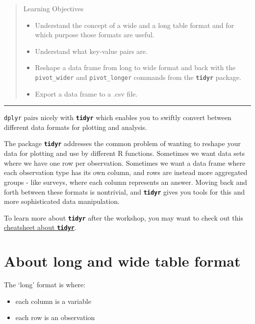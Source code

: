 \documentclass[
]{book}
\providecommand{\tightlist}{%
  \setlength{\itemsep}{0pt}\setlength{\parskip}{0pt}}
\begin{document}
\begin{quote}
Learning Objectives

\begin{itemize}
\tightlist
\item
  Understand the concept of a wide and a long table format and for which purpose those formats are useful.
\item
  Understand what key-value pairs are.
\item
  Reshape a data frame from long to wide format and back with the \texttt{pivot\_wider} and \texttt{pivot\_longer} commands from the \textbf{\texttt{tidyr}} package.
\item
  Export a data frame to a .csv file.
\end{itemize}
\end{quote}

\begin{center}\rule{0.5\linewidth}{0.5pt}\end{center}

\texttt{dplyr} pairs nicely with \textbf{\texttt{tidyr}} which enables you to swiftly convert between different data formats for plotting and analysis.

The package \textbf{\texttt{tidyr}} addresses the common problem of wanting to reshape your data for plotting and use by different R functions. Sometimes we want data sets where we have one row per observation. Sometimes we want a data frame where each observation type has its own column, and rows are instead more aggregated groups - like surveys, where each column represents an answer. Moving back and forth between these formats is nontrivial, and \textbf{\texttt{tidyr}} gives you tools for this and more sophisticated data manipulation.

To learn more about \textbf{\texttt{tidyr}} after the workshop, you may want to check out this \href{https://github.com/rstudio/cheatsheets/raw/master/data-import.pdf}{cheatsheet about \textbf{\texttt{tidyr}}}.

\hypertarget{about-long-and-wide-table-format}{%
\section{About long and wide table format}\label{about-long-and-wide-table-format}}

The `long' format is where:

\begin{itemize}
\tightlist
\item
  each column is a variable
\item
  each row is an observation
\end{itemize}
\end{document}
